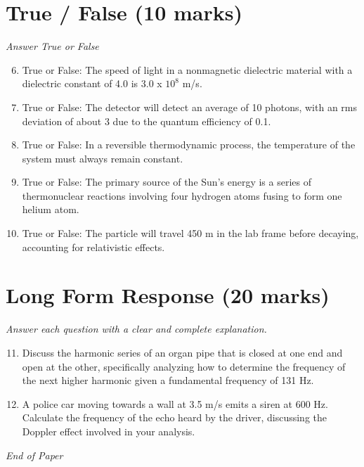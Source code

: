 \documentclass[12pt]{article}
\begin{document}
\section*{True / False (10 marks)}
\textit{Answer True or False}
\begin{enumerate}[label=\arabic*.]
\setcounter{enumi}{5}
\item True or False: The speed of light in a nonmagnetic dielectric material with a dielectric constant of 4.0 is 3.0 x $10^8$ m/s.
\item True or False: The detector will detect an average of 10 photons, with an rms deviation of about 3 due to the quantum efficiency of 0.1.
\item True or False: In a reversible thermodynamic process, the temperature of the system must always remain constant.
\item True or False: The primary source of the Sun's energy is a series of thermonuclear reactions involving four hydrogen atoms fusing to form one helium atom.
\item True or False: The particle will travel 450 m in the lab frame before decaying, accounting for relativistic effects.
\end{enumerate}

\section*{Long Form Response (20 marks)}
\textit{Answer each question with a clear and complete explanation.}
\begin{enumerate}[label=\arabic*.]
\setcounter{enumi}{10}
\item Discuss the harmonic series of an organ pipe that is closed at one end and open at the other, specifically analyzing how to determine the frequency of the next higher harmonic given a fundamental frequency of 131 Hz.
\item A police car moving towards a wall at 3.5 m/s emits a siren at 600 Hz. Calculate the frequency of the echo heard by the driver, discussing the Doppler effect involved in your analysis.
\end{enumerate}

\vfill
\noindent\textit{End of Paper}
\end{document}
